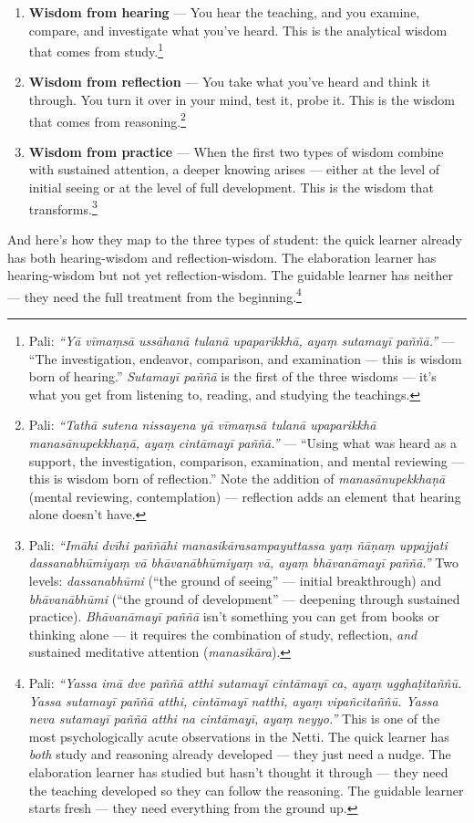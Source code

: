 \begin{enumerate}[itemsep=4pt]
\item \textbf{Wisdom from hearing} --- You hear the teaching, and you examine, compare, and investigate what you've heard. This is the analytical wisdom that comes from study.\footnote{Pali: \textit{``Yā vīmaṃsā ussāhanā tulanā upaparikkhā, ayaṃ sutamayī paññā.''} --- ``The investigation, endeavor, comparison, and examination --- this is wisdom born of hearing.'' \textit{Sutamayī paññā} is the first of the three wisdoms --- it's what you get from listening to, reading, and studying the teachings.}

\item \textbf{Wisdom from reflection} --- You take what you've heard and think it through. You turn it over in your mind, test it, probe it. This is the wisdom that comes from reasoning.\footnote{Pali: \textit{``Tathā sutena nissayena yā vīmaṃsā tulanā upaparikkhā manasānupekkhaṇā, ayaṃ cintāmayī paññā.''} --- ``Using what was heard as a support, the investigation, comparison, examination, and mental reviewing --- this is wisdom born of reflection.'' Note the addition of \textit{manasānupekkhaṇā} (mental reviewing, contemplation) --- reflection adds an element that hearing alone doesn't have.}

\item \textbf{Wisdom from practice} --- When the first two types of wisdom combine with sustained attention, a deeper knowing arises --- either at the level of initial seeing or at the level of full development. This is the wisdom that transforms.\footnote{Pali: \textit{``Imāhi dvīhi paññāhi manasikārasampayuttassa yaṃ ñāṇaṃ uppajjati dassanabhūmiyaṃ vā bhāvanābhūmiyaṃ vā, ayaṃ bhāvanāmayī paññā.''} Two levels: \textit{dassanabhūmi} (``the ground of seeing'' --- initial breakthrough) and \textit{bhāvanābhūmi} (``the ground of development'' --- deepening through sustained practice). \textit{Bhāvanāmayī paññā} isn't something you can get from books or thinking alone --- it requires the combination of study, reflection, \textit{and} sustained meditative attention (\textit{manasikāra}).}
\end{enumerate}

And here's how they map to the three types of student: the quick learner already has both hearing-wisdom and reflection-wisdom. The elaboration learner has hearing-wisdom but not yet reflection-wisdom. The guidable learner has neither --- they need the full treatment from the beginning.\footnote{Pali: \textit{``Yassa imā dve paññā atthi sutamayī cintāmayī ca, ayaṃ ugghaṭitaññū. Yassa sutamayī paññā atthi, cintāmayī natthi, ayaṃ vipañcitaññū. Yassa neva sutamayī paññā atthi na cintāmayī, ayaṃ neyyo.''} This is one of the most psychologically acute observations in the Netti. The quick learner has \textit{both} study and reasoning already developed --- they just need a nudge. The elaboration learner has studied but hasn't thought it through --- they need the teaching developed so they can follow the reasoning. The guidable learner starts fresh --- they need everything from the ground up.}

